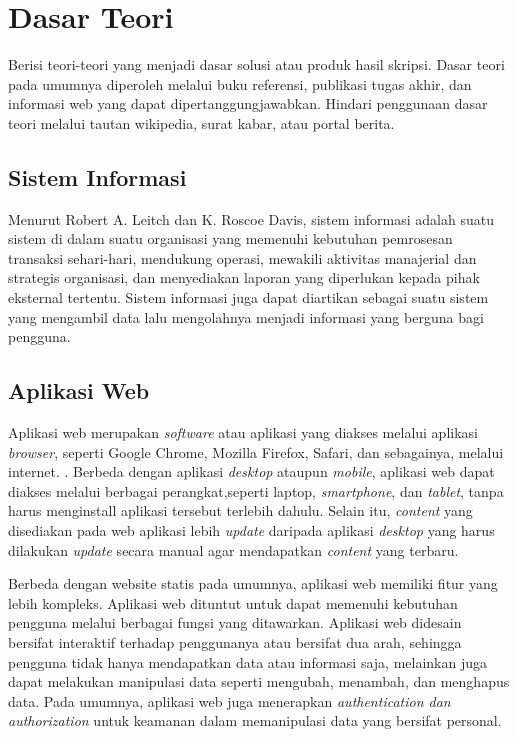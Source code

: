\section{Dasar Teori}

Berisi teori-teori yang menjadi dasar solusi atau produk hasil skripsi. Dasar teori pada umumnya diperoleh melalui buku referensi, publikasi tugas akhir, dan informasi web yang dapat dipertanggungjawabkan. Hindari penggunaan dasar teori melalui tautan wikipedia, surat kabar, atau portal berita.

\subsection{Sistem Informasi}
Menurut Robert A. Leitch dan K. Roscoe Davis, sistem informasi adalah suatu sistem di dalam 
suatu organisasi yang memenuhi kebutuhan pemrosesan transaksi sehari-hari, mendukung operasi, 
mewakili aktivitas manajerial dan strategis organisasi, dan menyediakan laporan yang 
diperlukan kepada pihak eksternal tertentu\cite{ratnasari_analisis_2017}. Sistem informasi juga dapat diartikan sebagai
suatu sistem yang mengambil data lalu mengolahnya menjadi informasi yang berguna bagi
pengguna. 

\subsection{Aplikasi Web}
Aplikasi web merupakan \textit{software} atau aplikasi yang diakses melalui aplikasi 
\textit{browser}, seperti Google Chrome, Mozilla Firefox, Safari, dan sebagainya, melalui 
internet. \cite{jazayeri_trends_2007}. Berbeda dengan aplikasi 
\textit{desktop} ataupun \textit{mobile}, aplikasi web dapat diakses melalui berbagai 
perangkat,seperti laptop, \textit{smartphone}, dan \textit{tablet}, tanpa harus menginstall 
aplikasi tersebut terlebih dahulu. Selain itu, \textit{content} yang disediakan pada web 
aplikasi lebih \textit{update} daripada aplikasi \textit{desktop} yang harus dilakukan \textit{update} 
secara manual agar mendapatkan \textit{content} yang terbaru.  

Berbeda dengan website statis pada umumnya, aplikasi web memiliki fitur yang lebih kompleks. 
Aplikasi web dituntut untuk dapat memenuhi kebutuhan pengguna melalui berbagai fungsi yang 
ditawarkan. Aplikasi web didesain bersifat interaktif terhadap penggunanya atau bersifat dua 
arah, sehingga pengguna tidak hanya mendapatkan data atau informasi saja, melainkan juga dapat 
melakukan manipulasi data seperti mengubah, menambah, dan menghapus data. Pada umumnya, 
aplikasi web juga menerapkan \textit{authentication \emph{dan} authorization} 
untuk keamanan dalam memanipulasi data yang bersifat personal\cite{geeksforgeeksDifferenceBetween}. 


